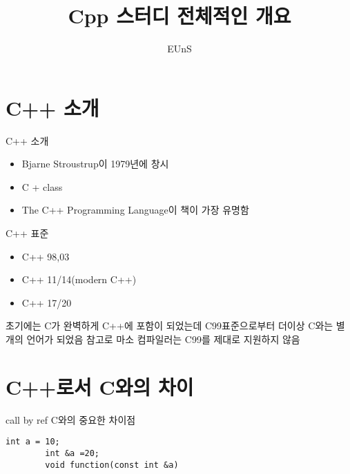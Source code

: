 \documentclass[10pt]{beamer}
\title{Cpp 스터디 전체적인 개요}
\author{EUnS}
\begin{document}

\begin{frame}
    \maketitle
\end{frame}    

\begin{frame}
    \tableofcontents

\end{frame}    

\section{C++ 소개}

\begin{frame}{C++ 소개}
    \begin{itemize}
        \item Bjarne Stroustrup이 1979년에 창시
        \item C + class
        \item The C++ Programming Language이 책이 가장 유명함
    \end{itemize}
\end{frame}

\begin{frame}{C++ 표준}
    \begin{itemize}
        \item C++ 98,03
        \item C++ 11/14(modern C++)
        \item C++ 17/20~
    \end{itemize}
    초기에는 C가 완벽하게 C++에 포함이 되었는데 C99표준으로부터 더이상 C와는 별개의 언어가 되었음 참고로 마소 컴파일러는 C99를 제대로 지원하지 않음
\end{frame}

\section{C++로서 C와의 차이}

\begin{frame}[fragile]{call by ref}
    C와의 중요한 차이점
    \begin{lstlisting}[style = CStyle]
        int a = 10;
        int &a =20;
        void function(const int &a)
    \end{lstlisting}
\end{frame}
\end{document}
